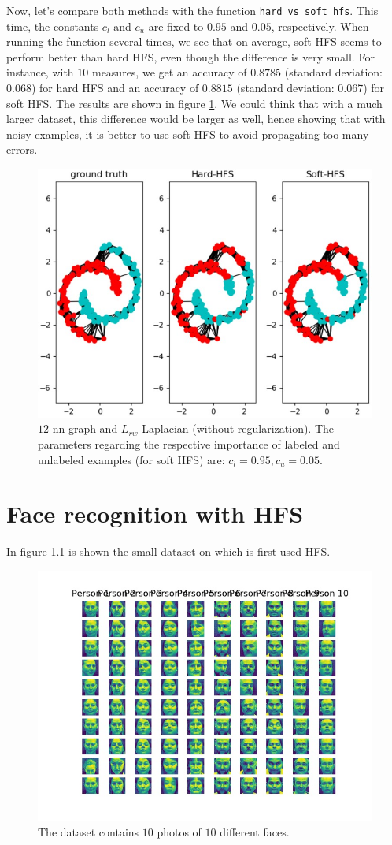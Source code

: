\documentclass[a4paper, 11pt]{report}
\begin{document}
\begin{enumerate}
	Now, let's compare both methods with the function \texttt{hard\_vs\_soft\_hfs}. This time, the constants $c_l$ and $c_u$ are fixed to $0.95$ and $0.05$, respectively. When running the function several times, we see that on average, soft HFS seems to perform better than hard HFS, even though the difference is very small. For instance, with $10$ measures, we get an accuracy of $0.8785$ (standard deviation: $0.068$) for hard HFS and an accuracy of $0.8815$ (standard deviation: 0.067) for soft HFS. The results are shown in figure \ref{fig:q13-comparison}. We could think that with a much larger dataset, this difference would be larger as well, hence showing that with noisy examples, it is better to use soft HFS to avoid propagating too many errors.
	
	\begin{figure}[!htb]
	    \centering
	    \includegraphics[width=.5\textwidth]{images/q13_comparison.jpg}
	    \caption{$12$-nn graph and $L_{rw}$ Laplacian (without regularization). The parameters regarding the respective importance of labeled and unlabeled examples (for soft HFS) are: $c_l = 0.95, c_u = 0.05$.}
	    \label{fig:q13-comparison}
	\end{figure}
\end{enumerate}

\pagebreak
\chapter{Face recognition with HFS}

In figure \ref{fig:small-faces-dataset} is shown the small dataset on which is first used HFS.

\begin{figure}[!htb]
    \centering
    \includegraphics[width=.6\textwidth]{images/faces_dataset.jpg}
    \caption{The dataset contains $10$ photos of $10$ different faces.}
    \label{fig:small-faces-dataset}
\end{figure}
\end{document}
